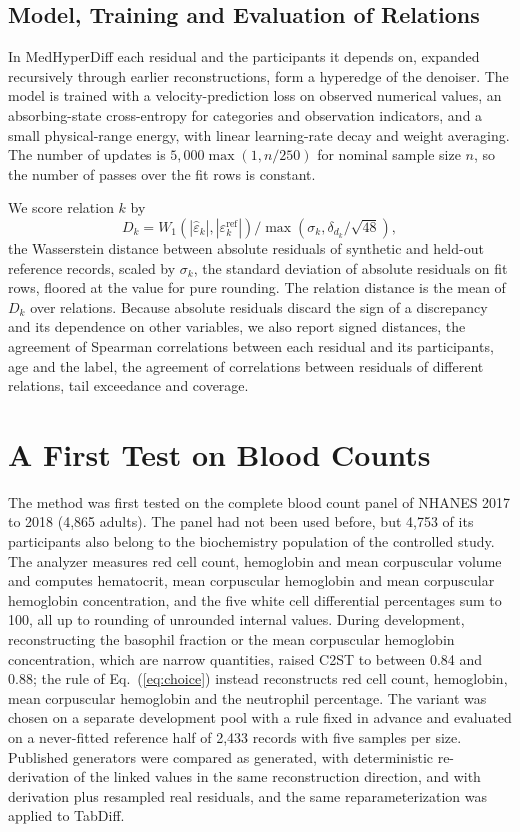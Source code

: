 \documentclass[conference]{IEEEtran}
\begin{document}
\subsection*{Model, Training and Evaluation of Relations}

In MedHyperDiff each residual and the participants it depends on, expanded recursively through earlier reconstructions, form a hyperedge of the denoiser. The model is trained with a velocity-prediction loss on observed numerical values, an absorbing-state cross-entropy for categories and observation indicators, and a small physical-range energy, with linear learning-rate decay and weight averaging. The number of updates is $5{,}000 \max(1, n/250)$ for nominal sample size $n$, so the number of passes over the fit rows is constant.

We score relation $k$ by
\begin{equation}
D_k = W_1\!\left(|\hat{\varepsilon}_k|, |\varepsilon_k^{\mathrm{ref}}|\right) / \max\!\left(\sigma_k, \delta_{d_k}/\sqrt{48}\right),
\label{eq:metric}
\end{equation}
the Wasserstein distance between absolute residuals of synthetic and held-out reference records, scaled by $\sigma_k$, the standard deviation of absolute residuals on fit rows, floored at the value for pure rounding. The relation distance is the mean of $D_k$ over relations. Because absolute residuals discard the sign of a discrepancy and its dependence on other variables, we also report signed distances, the agreement of Spearman correlations between each residual and its participants, age and the label, the agreement of correlations between residuals of different relations, tail exceedance and coverage.

\section{A First Test on Blood Counts}

The method was first tested on the complete blood count panel of NHANES 2017 to 2018 (4,865 adults). The panel had not been used before, but 4,753 of its participants also belong to the biochemistry population of the controlled study. The analyzer measures red cell count, hemoglobin and mean corpuscular volume and computes hematocrit, mean corpuscular hemoglobin and mean corpuscular hemoglobin concentration, and the five white cell differential percentages sum to 100, all up to rounding of unrounded internal values. During development, reconstructing the basophil fraction or the mean corpuscular hemoglobin concentration, which are narrow quantities, raised C2ST to between 0.84 and 0.88; the rule of Eq.~(\ref{eq:choice}) instead reconstructs red cell count, hemoglobin, mean corpuscular hemoglobin and the neutrophil percentage. The variant was chosen on a separate development pool with a rule fixed in advance and evaluated on a never-fitted reference half of 2,433 records with five samples per size. Published generators were compared as generated, with deterministic re-derivation of the linked values in the same reconstruction direction, and with derivation plus resampled real residuals, and the same reparameterization was applied to TabDiff.
\end{document}
